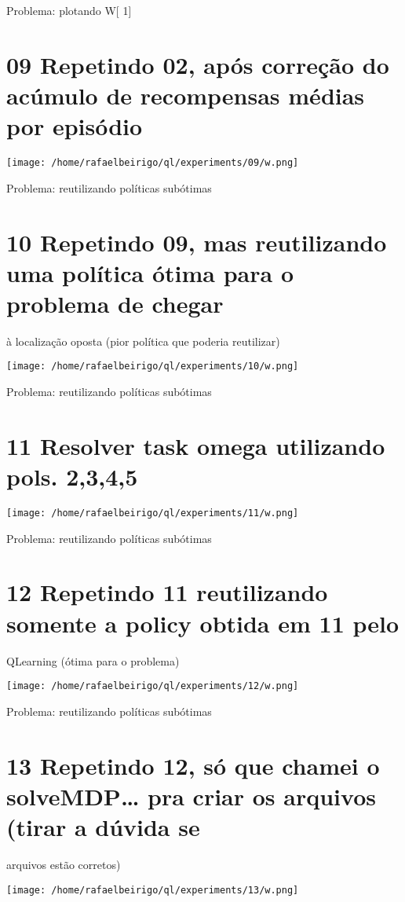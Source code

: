\documentclass[11pt]{article}
\begin{document}
  Problema: plotando W[ 1]


\section{09 Repetindo 02, após correção do acúmulo de recompensas médias por episódio}
\label{sec-10}

\centerline{\texttt{[image: /home/rafaelbeirigo/ql/experiments/09/w.png]}}

Problema: reutilizando políticas subótimas


\section{10 Repetindo 09, mas reutilizando uma política ótima para o problema de chegar}
\label{sec-11}

  à localização oposta (pior política que poderia reutilizar)
\centerline{\texttt{[image: /home/rafaelbeirigo/ql/experiments/10/w.png]}}

Problema: reutilizando políticas subótimas


\section{11 Resolver task omega utilizando pols. 2,3,4,5}
\label{sec-12}

\centerline{\texttt{[image: /home/rafaelbeirigo/ql/experiments/11/w.png]}}

Problema: reutilizando políticas subótimas


\section{12 Repetindo 11 reutilizando somente a policy obtida em 11 pelo}
\label{sec-13}

  QLearning (ótima para o problema)
\centerline{\texttt{[image: /home/rafaelbeirigo/ql/experiments/12/w.png]}}

Problema: reutilizando políticas subótimas


\section{13 Repetindo 12, só que chamei o solveMDP\ldots{} pra criar os arquivos (tirar a dúvida se}
\label{sec-14}

  arquivos estão corretos)
\centerline{\texttt{[image: /home/rafaelbeirigo/ql/experiments/13/w.png]}}
\end{document}
